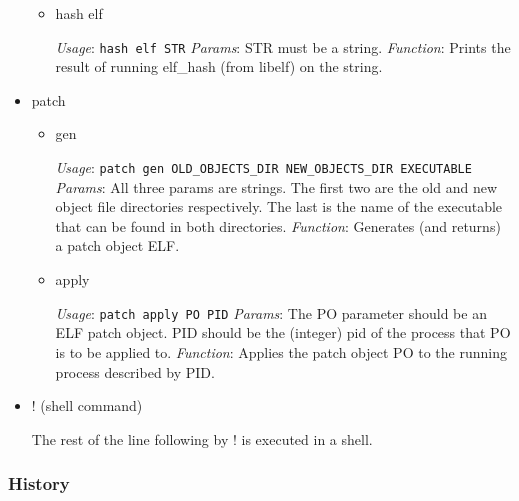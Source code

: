 \documentclass[11pt]{article}
\begin{document}
\begin{itemize}
\begin{itemize}

\item hash elf\\
\label{sec-2.1.2.6.1}

      \emph{Usage}: \texttt{hash elf STR}
      \emph{Params}: STR must be a string.
      \emph{Function}: Prints the result of running elf\_{}hash (from libelf)
                  on the string.
                  
\end{itemize} %

\item patch\\
\label{sec-2.1.2.7}

\begin{itemize}

\item gen\\
\label{sec-2.1.2.7.1}

      \emph{Usage}: \texttt{patch gen OLD\_OBJECTS\_DIR NEW\_OBJECTS\_DIR EXECUTABLE}
      \emph{Params}: All three params are strings. The first two are the
                old and new object file directories respectively. The
                last is the name of the executable that can be found
                in both directories.
      \emph{Function}: Generates (and returns) a patch object ELF.

\item apply\\
\label{sec-2.1.2.7.2}

      \emph{Usage}: \texttt{patch apply PO PID}
      \emph{Params}: The PO parameter should be an ELF patch object. PID
                should be the (integer) pid of the process that PO is
                to be applied to.
      \emph{Function}: Applies the patch object PO to the running process
                  described by PID.
\end{itemize} %

\item ! (shell command)\\
\label{sec-2.1.2.8}

     The rest of the line following by ! is executed in a shell.
\end{itemize} %
\subsubsection{History}
\label{sec-2.1.3}
\end{document}
